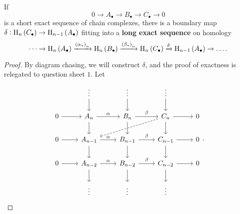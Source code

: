 \begin{proposition}
If
$$ 0 \to A_\bullet \to B_\bullet \to C_\bullet \to 0 $$
is a short exact sequence of chain complexes, there is a boundary map $ \delta : \H_n\br{C_\bullet} \to \H_{n - 1}\br{A_\bullet} $ fitting into a \textbf{long exact sequence} on homology
$$ \dots \to \H_n\br{A_\bullet} \xrightarrow{\br{\alpha_*}_n} \H_n\br{B_\bullet} \xrightarrow{\br{\beta_*}_n} \H_n\br{C_\bullet} \xrightarrow{\delta} \H_{n - 1}\br{A_\bullet} \to \dots. $$
\end{proposition}

\begin{proof}
By diagram chasing, we will construct $ \delta $, and the proof of exactness is relegated to question sheet $ 1 $. Let
$$
\begin{tikzcd}
& \vdots \arrow{d} & \vdots \arrow{d} & \vdots \arrow{d} & \\
0 \arrow{r} & A_n \arrow{r}{\alpha} \arrow{d} & B_n \arrow{r}{\beta} \arrow{d} & C_n \arrow{r} \arrow[dashed]{dll} \arrow{d} & 0 \\
0 \arrow{r} & A_{n - 1} \arrow{r}{\alpha} \arrow{d} & B_{n - 1} \arrow{r}{\beta} \arrow{d} & C_{n - 1} \arrow{r} \arrow{d} & 0 \\
0 \arrow{r} & A_{n - 2} \arrow{r}{\alpha} \arrow{d} & B_{n - 2} \arrow{r}{\beta} \arrow{d} & C_{n - 2} \arrow{r} \arrow{d} & 0 \\
& \vdots & \vdots & \vdots &
\end{tikzcd}.
$$

\pagebreak


\end{proof}

